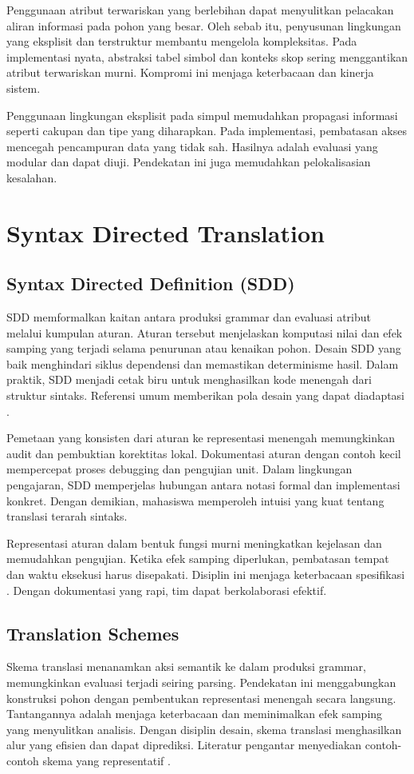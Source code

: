 \documentclass[../main.tex]{subfiles}
\begin{document}
Penggunaan atribut terwariskan yang berlebihan dapat menyulitkan pelacakan aliran informasi pada pohon yang besar. Oleh sebab itu, penyusunan lingkungan yang eksplisit dan terstruktur membantu mengelola kompleksitas. Pada implementasi nyata, abstraksi tabel simbol dan konteks skop sering menggantikan atribut terwariskan murni. Kompromi ini menjaga keterbacaan dan kinerja sistem.

Penggunaan lingkungan eksplisit pada simpul memudahkan propagasi informasi seperti cakupan dan tipe yang diharapkan. Pada implementasi, pembatasan akses mencegah pencampuran data yang tidak sah. Hasilnya adalah evaluasi yang modular dan dapat diuji. Pendekatan ini juga memudahkan pelokalisasian kesalahan.

\section{Syntax Directed Translation}
\subsection{Syntax Directed Definition (SDD)}
SDD memformalkan kaitan antara produksi grammar dan evaluasi atribut melalui kumpulan aturan. Aturan tersebut menjelaskan komputasi nilai dan efek samping yang terjadi selama penurunan atau kenaikan pohon. Desain SDD yang baik menghindari siklus dependensi dan memastikan determinisme hasil. Dalam praktik, SDD menjadi cetak biru untuk menghasilkan kode menengah dari struktur sintaks. Referensi umum memberikan pola desain yang dapat diadaptasi \citep{WikiSDT}.

Pemetaan yang konsisten dari aturan ke representasi menengah memungkinkan audit dan pembuktian korektitas lokal. Dokumentasi aturan dengan contoh kecil mempercepat proses debugging dan pengujian unit. Dalam lingkungan pengajaran, SDD memperjelas hubungan antara notasi formal dan implementasi konkret. Dengan demikian, mahasiswa memperoleh intuisi yang kuat tentang translasi terarah sintaks.

Representasi aturan dalam bentuk fungsi murni meningkatkan kejelasan dan memudahkan pengujian. Ketika efek samping diperlukan, pembatasan tempat dan waktu eksekusi harus disepakati. Disiplin ini menjaga keterbacaan spesifikasi \citep{WikiSDT}. Dengan dokumentasi yang rapi, tim dapat berkolaborasi efektif.

\subsection{Translation Schemes}
Skema translasi menanamkan aksi semantik ke dalam produksi grammar, memungkinkan evaluasi terjadi seiring parsing. Pendekatan ini menggabungkan konstruksi pohon dengan pembentukan representasi menengah secara langsung. Tantangannya adalah menjaga keterbacaan dan meminimalkan efek samping yang menyulitkan analisis. Dengan disiplin desain, skema translasi menghasilkan alur yang efisien dan dapat diprediksi. Literatur pengantar menyediakan contoh-contoh skema yang representatif \citep{WikiSDT}.
\end{document}
